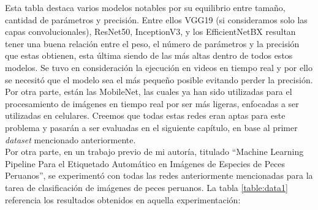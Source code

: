 Esta tabla destaca varios modelos notables por su equilibrio entre 
tamaño, cantidad de parámetros y precisión. Entre ellos VGG19 
(si consideramos solo las capas convolucionales), ResNet50, InceptionV3, 
y los EfficientNetBX resultan tener una buena relación entre el peso, el 
número de parámetros y la precisión que estas obtienen, esta última 
siendo de las más altas dentro de todos estos modelos. Se tuvo en 
consideración la ejecución en videos en tiempo real y por ello se necesitó 
que el modelo sea el más pequeño posible evitando perder la precisión. Por 
otra parte, están las MobileNet, las cuales ya han sido utilizadas para el 
procesamiento de imágenes en tiempo real por ser más ligeras, enfocadas a 
ser utilizadas en celulares. Creemos que todas estas redes eran aptas para 
este problema y pasarán a ser evaluadas en el siguiente capítulo, en base 
al primer \textit{dataset} mencionado anteriormente. \\

Por otra parte, en un trabajo previo de mi autoría, titulado ``Machine 
Learning Pipeline Para el Etiquetado Automático en Imágenes de Especies de 
Peces Peruanos''\cite{Madera2024}, se experimentó con todas las 
redes anteriormente mencionadas para la tarea de clasificación de imágenes 
de peces peruanos. La tabla \ref{table:data1} referencia los resultados 
obtenidos en aquella experimentación:

